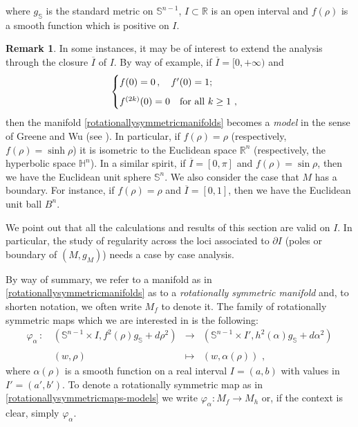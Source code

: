\documentclass[11pt]{amsart}
\theoremstyle{plain}
\theoremstyle{definition}
\newtheorem{remark}       [theorem]  {Remark}
\numberwithin{equation}{section}
\def \R{{\mathbb R}}
\def \s{{\mathbb S}}
\def \H{{\mathbb H}}
\numberwithin{equation}{section}
\begin{document}
where $g_{\s}$ is the standard metric on $\s^{n-1}$, $I\subset \R$ is an open interval and $f(\rho)$ is a smooth function which is positive on $I$.
\begin{remark}\label{remark-interior-I}
In some instances, it may be of interest to extend the analysis through the closure $\overline{I}$ of $I$. By way of example, if $\overline{I}=[0,+\infty)$ and
\begin{equation}\label{condizioni-su-f}
\begin{cases}
    f(0)=0 \,, \quad f'(0)=1  ; \\[6pt]
    f^{(2k)}(0)=0 \quad {\rm for} \,\, {\rm all } \,\, k \geq 1 \,\, ,\\
  \end{cases}
\end{equation}
then the manifold \eqref{rotationallysymmetricmanifolds} becomes a \textit{model} in the sense of Greene and Wu (see \cite{GW, Petersen}). In particular, if $f(\rho)=\rho$ (respectively, $f(\rho)=\sinh \rho$) it is isometric to the Euclidean space $\R^{n}$ (respectively, the hyperbolic space $\H^{n}$). In a similar spirit, if $\overline{I}=[0,\pi]$ and $f(\rho)=\sin \rho$, then we have the Euclidean unit sphere $\s^{n}$.
We also consider the case that $M$ has a boundary. For instance, if $f(\rho)=\rho$ and $\overline{I}=[0,1]$, then we have the Euclidean unit ball $B^n$.

We point out that all the calculations and results of this section are valid on $I$. In particular, the study of regularity across the loci associated to $\partial I$ (poles or boundary of $\left( M,g_M \right )$) needs a case by case analysis.
\end{remark}
By way of summary, we refer to a manifold as in \eqref{rotationallysymmetricmanifolds} as to a \textit{rotationally symmetric manifold} and, to shorten notation, we often write $M_{f}$ to denote it. The family of rotationally symmetric maps which we are interested in is the following:
\begin{equation}\label{rotationallysymmetricmaps-models}\begin{array}{lrll}
                                           \varphi_{\alpha} \,:\, &\left (\s^{n-1} \times I, f^2(\rho)g_{\s}+d\rho^2 \right ) &\to &  \left (\s^{n-1} \times I', h^2(\alpha)g_{\s}+d\alpha^2 \right ) \\
                                           &&& \\
                                           &(w,\rho) &\mapsto & (w,\alpha(\rho)) \,\, ,
                                         \end{array}
\end{equation}
where $\alpha(\rho)$ is a smooth function on a real interval $I=(a,b)$ with values in $I'=(a',b')$. To denote a rotationally symmetric map as in \eqref{rotationallysymmetricmaps-models} we write $\varphi_{\alpha}:M_f \to M_h$ or, if the context is clear, simply $\varphi_\alpha$. 
\end{document}

